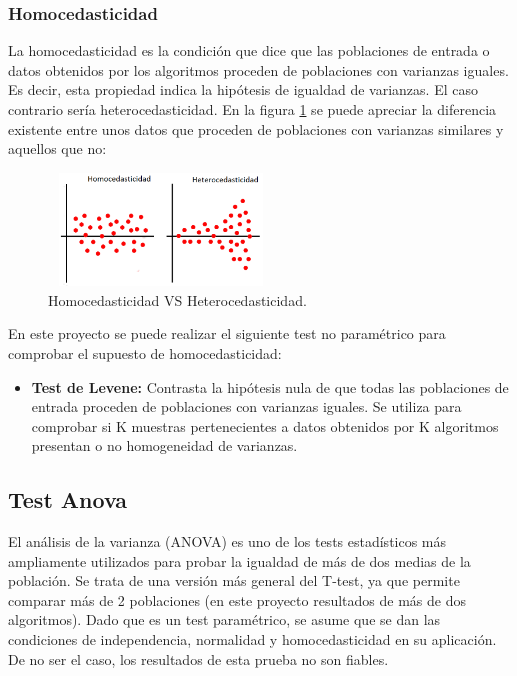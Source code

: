 \subsubsection{Homocedasticidad}
La homocedasticidad es la condición que dice que las poblaciones de entrada o datos obtenidos por los algoritmos
proceden de poblaciones con varianzas iguales. Es decir, esta propiedad indica la hipótesis de igualdad de
varianzas. El caso contrario sería heterocedasticidad. En la figura \ref{fig:homocedasticidad} se puede apreciar
la diferencia existente entre unos datos que proceden de poblaciones con varianzas similares y aquellos que
no:

\begin{figure}[h]
\centering
\includegraphics[width=6cm,height=3cm]{figuras/homocedasticidad.png}
\caption{Homocedasticidad VS Heterocedasticidad.}
\label{fig:homocedasticidad}
\end{figure} 

En este proyecto se puede realizar el siguiente test no paramétrico para comprobar el supuesto de homocedasticidad:

\begin{itemize}
\item \textbf{Test de Levene:} Contrasta la hipótesis nula de que todas las poblaciones de entrada proceden de
poblaciones con varianzas iguales. Se utiliza para comprobar si K muestras pertenecientes a datos obtenidos por
K algoritmos presentan o no homogeneidad de varianzas. 
\end{itemize}


\subsection{Test Anova}
El análisis de la varianza (ANOVA) es uno de los tests estadísticos más ampliamente utilizados para probar
la igualdad de más de dos medias de la población. Se trata de una versión más general del T-test, ya que permite
comparar más de 2 poblaciones (en este proyecto resultados de más de dos algoritmos). Dado que es un test
paramétrico, se asume que se dan las condiciones de independencia, normalidad y homocedasticidad en su
aplicación. De no ser el caso, los resultados de esta prueba no son fiables.

